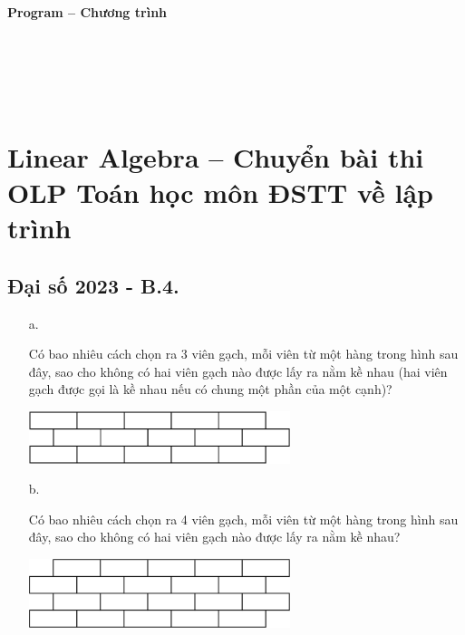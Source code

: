 \documentclass{article}
\begin{document}
\paragraph{Program -- Chương trình} \mbox{} \\


\begin{lstlisting}

	
\end{lstlisting}


\section{Linear Algebra -- Chuyển bài thi OLP Toán học môn ĐSTT về lập trình}

\subsection{Đại số 2023 - B.4.}
    \begin{enumerate}
        \item[a.] {Có bao nhiêu cách chọn ra 3 viên gạch, mỗi viên từ một hàng trong hình sau đây, sao cho không có hai viên gạch nào được lấy ra nằm kề nhau (hai viên gạch được gọi là kề nhau nếu có chung một phần của một cạnh)?
        
        \begin{center}
            \includegraphics[width=0.6\textwidth]{Figures/01.png}
        \end{center}}
        \item[b.] {Có bao nhiêu cách chọn ra 4 viên gạch, mỗi viên từ một hàng trong hình sau đây, sao cho không có hai viên gạch nào được lấy ra nằm kề nhau?
        
        \begin{center}
            \includegraphics[width=0.6\textwidth]{Figures/02.png}
        \end{center}}
    \end{enumerate}
\end{document}
